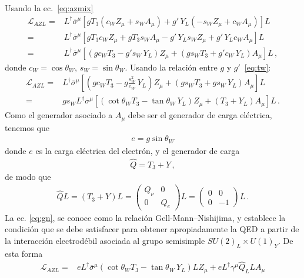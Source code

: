 \begin{frame}
Usando la ec.~\eqref{eq:azmix}
\begin{align}
   \mathcal{L}_{A Z L}=& L^{\dagger}\overline{\sigma}^\mu\left[g T_3(c_W Z_\mu+s_W A_\mu)+g'\,Y_L(-s_W Z_\mu+c_W A_\mu)\right]L\nonumber\\
     =& L^{\dagger}\overline{\sigma}^\mu\left[g T_3c_W Z_\mu+g T_3s_W A_\mu-g'\,Y_Ls_W Z_\mu+g'\,Y_Lc_W A_\mu\right]L\nonumber\\
    =& L^{\dagger}\overline{\sigma}^\mu\left[\left(g c_WT_3-g's_W\,Y_L\right)Z_\mu
       +\left(g s_W T_3+g'c_W\,Y_L\right) A_\mu\right]L\,,
\end{align}
donde $c_W=\cos\theta_W$, $s_W=\sin\theta_W$. Usando la relación entre $g$ y $g'$~\eqref{eq:tw}:
\begin{align}
    \mathcal{L}_{A Z L}=& L^{\dagger}\overline{\sigma}^\mu\left[\left(g c_WT_3-g \frac{s_W^2}{c_W}\,Y_L\right)Z_\mu
       +\left(g s_W T_3+g s_W\,Y_L\right) A_\mu\right]L\nonumber\\
=&g s_W L^{\dagger}\overline{\sigma}^\mu\left[\left(\cot\theta_WT_3- \tan\theta_W\,Y_L\right)Z_\mu
       +\left(T_3+Y_L\right) A_\mu\right]L\,.
\end{align}
Como el generador asociado a $A_\mu$ debe ser el generador de carga eléctrica, tenemos que
\begin{align}
  e=g\sin\theta_W
\end{align}
donde $e$ es la carga eléctrica del electrón, y el generador de carga
\begin{align}
\label{eq:gn}
  \widehat{Q}=T_3+Y\,,
\end{align}
de modo que
\begin{align}
  \widehat{Q}L=(T_3+Y)L=
  \begin{pmatrix}
    Q_\nu & 0\\
    0  & Q_e
  \end{pmatrix}L=  \begin{pmatrix}
    0 & 0\\
    0  & -1
  \end{pmatrix}L
\,.
\end{align}
La ec. \eqref{eq:gn}, se conoce como la relación Gell-Mann--Nishijima, y establece la condición que se debe satisfacer para obtener apropiadamente la QED a partir de la interacción electrodébil asociada al grupo semisimple $SU(2)_L\times  U(1)_Y$.
De esta forma
\begin{align}
    \mathcal{L}_{A Z L}
=&e L^{\dagger}\overline{\sigma}^\mu\left(\cot\theta_W T_3-\tan\theta_W\,Y_L\right)L Z_\mu
       +e L^{\dagger}\gamma^\mu \widehat{Q}_L L A_\mu\nonumber\\

\end{align}
\end{frame}
